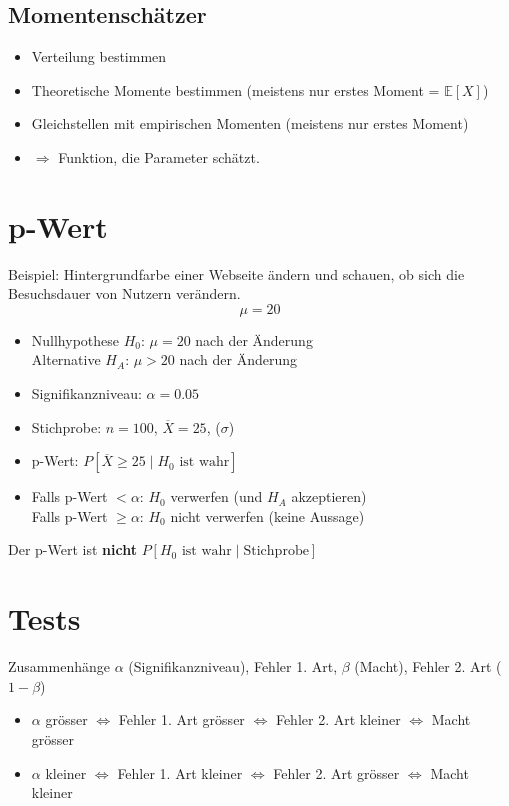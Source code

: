 \subsection{Momentenschätzer}

\begin{itemize}
	\item Verteilung bestimmen
	\item Theoretische Momente bestimmen (meistens nur erstes Moment = $\mathbb{E}[X]$)
	\item Gleichstellen mit empirischen Momenten (meistens nur erstes Moment)
	\item $\Rightarrow$ Funktion, die Parameter schätzt.
\end{itemize}

\section{p-Wert}

Beispiel: Hintergrundfarbe einer Webseite ändern und schauen, ob sich die Besuchsdauer von Nutzern verändern. $$\mu = 20$$

\begin{itemize}
	\item Nullhypothese $H_0$: $\mu = 20$ nach der Änderung\\Alternative $H_A$: $\mu > 20$ nach der Änderung
	\item Signifikanzniveau: $\alpha = 0.05$
	\item Stichprobe: $n=100$, $\overline{X} = 25$, ($\sigma$)
	\item p-Wert: $P[\overline{X} \geq 25 \mid H_0 \text{ ist wahr}]$
	\item Falls p-Wert $< \alpha$: $H_0$ verwerfen (und $H_A$ akzeptieren)\\Falls p-Wert $\geq \alpha$: $H_0$ nicht verwerfen (keine Aussage)
\end{itemize}

Der p-Wert ist \textbf{nicht} $P[H_0 \text{ ist wahr} \mid \text{Stichprobe}]$

\section{Tests}

Zusammenhänge $\alpha$ (Signifikanzniveau), Fehler 1. Art, $\beta$ (Macht), Fehler 2. Art ($1-\beta$)

\begin{itemize}
	\item $\alpha$ grösser $\iff$ Fehler 1. Art grösser $\iff$ Fehler 2. Art kleiner $\iff$ Macht grösser
	\item $\alpha$ kleiner $\iff$ Fehler 1. Art kleiner $\iff$ Fehler 2. Art grösser $\iff$ Macht kleiner
\end{itemize}

